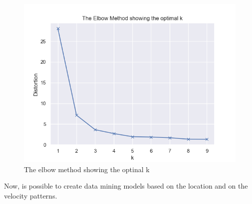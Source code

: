 \begin{figure}[H]
\centering
\includegraphics[width=0.8\linewidth]{Chapters/img/elbow_method_server.png}
\caption{The elbow method showing the optinal k}
\label{fig:elbow_method_server}
\end{figure}
Now, is possible to create data mining models based on the location and on the velocity patterns. 


\newpage
